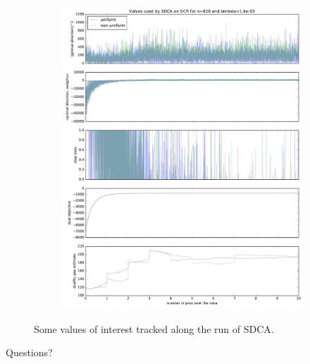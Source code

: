 \documentclass{beamer}
\DeclareMathOperator{\1}{\mathbb{1}}
\begin{document}
\begin{frame}
\begin{figure}
\begin{subfigure}[t]{0.3\textwidth}
        \includegraphics[width=\textwidth]{images/20170914_040717_ocr_annex}
    \end{subfigure}
    \caption{Some values of interest tracked along the run of SDCA.}
	\label{ocr annexes}
\end{figure}
\end{frame}
\begin{frame}
\Huge{\centerline{Questions?}}
\end{frame}
\appendix
\end{document}
